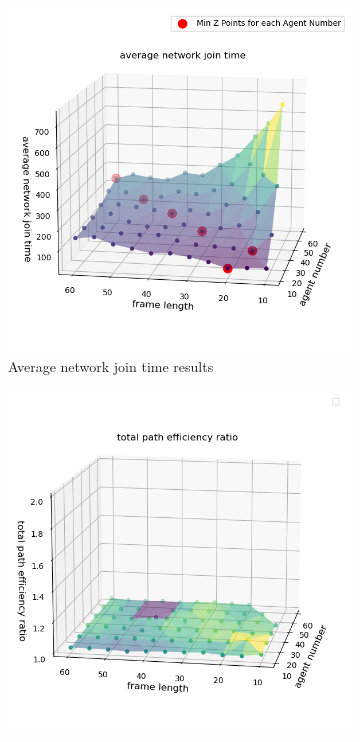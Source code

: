 \begin{figure}[htbp]
    \vspace{1cm}
    
    \begin{subfigure}[t]{0.45\linewidth}
        \centering
        \includegraphics[width = \linewidth]{figures/avg_network_join_time.png}
        \caption{Average network join time results}
        \label{fig:Performance3}
    \end{subfigure}
    \hfill
    \begin{subfigure}[t]{0.45\linewidth}
        \centering
        \includegraphics[width = \linewidth]{figures/total_path_effi_ratio.png}

\end{subfigure}
\end{figure}
